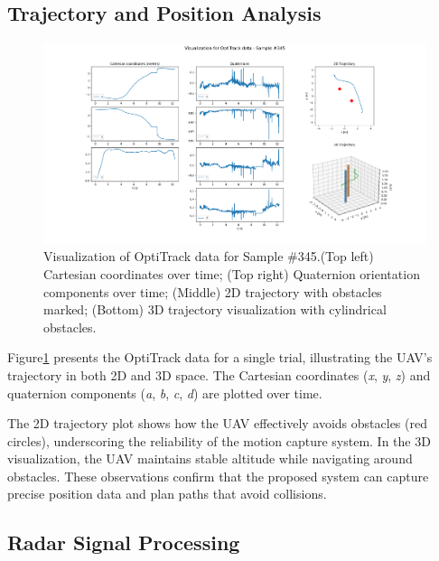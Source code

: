 \documentclass[12pt,a4paper]{article}
\begin{document}
\subsection{Trajectory and Position Analysis}

\begin{figure}[h!]
    \centering
    \includegraphics[width=\textwidth]{OptiTrack_sample_345.png}
    \caption{Visualization of OptiTrack data for Sample \#345.(Top left) Cartesian coordinates over time; (Top right) Quaternion orientation components over time; (Middle) 2D trajectory with obstacles marked; (Bottom) 3D trajectory visualization with cylindrical obstacles.}
    \label{fig:OptiTrack}
\end{figure}

Figure\ref{fig:OptiTrack} presents the OptiTrack data for a single trial, illustrating the UAV's trajectory in both 2D and 3D space. The Cartesian coordinates (\textit{x}, \textit{y}, \textit{z}) and quaternion components (\textit{a}, \textit{b}, \textit{c}, \textit{d}) are plotted over time. 

The 2D trajectory plot shows how the UAV effectively avoids obstacles (red circles), underscoring the reliability of the motion capture system. In the 3D visualization, the UAV maintains stable altitude while navigating around obstacles. These observations confirm that the proposed system can capture precise position data and plan paths that avoid collisions.

\subsection{Radar Signal Processing}
\end{document}
